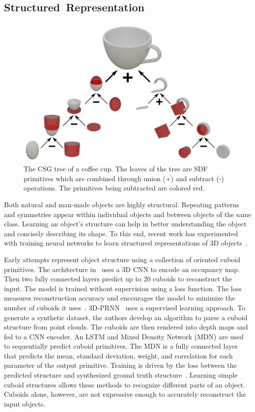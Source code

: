 \newpage


\subsection{Structured~Representation}
\label{subsec:structured_representation}

\begin{figure}[ht]
	\centering
	\includegraphics[scale=0.5]{Images/CSG Cup}
	\caption{The CSG tree of a coffee cup. The leaves of the tree are SDF primitives which are combined through union (+) and subtract (-) operations. The primitives being subtracted are colored red.}
	\label{fig:csg_cup}
\end{figure}

Both natural and man-made objects are highly structural. Repeating patterns and symmetries appear within individual objects and between objects of the same class. Learning an object's structure can help in better understanding the object and concisely describing its shape. To this end, recent work has experimented with training neural networks to learn structured representations of 3D objects~\cite{Tulsiani2017}.

Early attempts represent object structure using a collection of oriented cuboid primitives. The architecture in~\cite{Tulsiani2017} uses a 3D CNN to encode an occupancy map. Then two fully connected layers predict up to 20 cuboids to reconstruct the input. The model is trained without supervision using a loss function. The loss measures reconstruction accuracy and encourages the model to minimize the number of cuboids it uses~\cite{Tulsiani2017}. 3D-PRNN~\cite{Zou2017} uses a supervised learning approach. To generate a synthetic dataset, the authors develop an algorithm to parse a cuboid structure from point clouds. The cuboids are then rendered into depth maps and fed to a CNN encoder. An LSTM and Mixed Density Network (MDN) are used to sequentially predict cuboid primitives. The MDN is a fully connected layer that predicts the mean, standard deviation, weight, and correlation for each parameter of the output primitive. Training is driven by the loss between the predicted structure and synthesized ground truth structure~\cite{Zou2017}. Learning simple cuboid structures allows these methods to recognize different parts of an object. Cuboids alone, however, are not expressive enough to accurately reconstruct the input objects.


